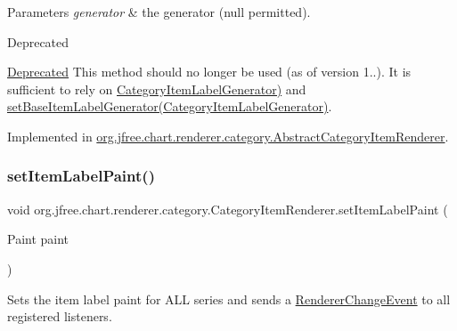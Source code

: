 \begin{DoxyParams}{Parameters}
{\em generator} & the generator ({\ttfamily null} permitted).\\
\hline
\end{DoxyParams}
\begin{DoxyRefDesc}{Deprecated}
\item[\mbox{\hyperlink{deprecated__deprecated000167}{Deprecated}}]This method should no longer be used (as of version 1..). It is sufficient to rely on \mbox{\hyperlink{}{Category\+Item\+Label\+Generator)}} and \mbox{\hyperlink{interfaceorg_1_1jfree_1_1chart_1_1renderer_1_1category_1_1_category_item_renderer_aa4ca7bd2b2d702c879718fece021d3a4}{set\+Base\+Item\+Label\+Generator(\+Category\+Item\+Label\+Generator)}}. \end{DoxyRefDesc}


Implemented in \mbox{\hyperlink{classorg_1_1jfree_1_1chart_1_1renderer_1_1category_1_1_abstract_category_item_renderer_a015b1d8609ab314a0192920d79dbdb8d}{org.\+jfree.\+chart.\+renderer.\+category.\+Abstract\+Category\+Item\+Renderer}}.

\mbox{\label{interfaceorg_1_1jfree_1_1chart_1_1renderer_1_1category_1_1_category_item_renderer_aac3a93a3b766677b28bcb79d233a498b}} 
\subsubsection{\texorpdfstring{set\+Item\+Label\+Paint()}{setItemLabelPaint()}}
{\footnotesize\ttfamily void org.\+jfree.\+chart.\+renderer.\+category.\+Category\+Item\+Renderer.\+set\+Item\+Label\+Paint (\begin{DoxyParamCaption}\item[{Paint}]{paint }\end{DoxyParamCaption})}

Sets the item label paint for A\+LL series and sends a \mbox{\hyperlink{}{Renderer\+Change\+Event}} to all registered listeners.


